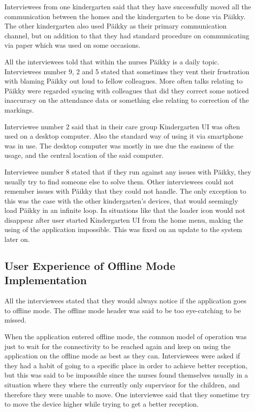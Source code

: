 Interviewees from one kindergarten said that they have successfully moved all the communication between the homes and the kindergarten to be done via Päikky. The other kindergarten also used Päikky as their primary communication channel, but on addition to that they had standard procedure on communicating via paper which was used on some occasions.

All the interviewees told that within the nurses Päikky is a daily topic. Interviewees number 9, 2 and 5 stated that sometimes they vent their frustration with blaming Päikky out loud to fellow colleagues. More often talks relating to Päikky were regarded syncing with colleagues that did they correct some noticed inaccuracy on the attendance data or something else relating to correction of the markings.

Interviewee number 2 said that in their care group Kindergarten UI was often used on a desktop computer. Also the standard way of using it via smartphone was in use. The desktop computer was mostly in use due the easiness of the usage, and the central location of the said computer. 

Interviewee number 8 stated that if they run against any issues with Päikky, they usually try to find someone else to solve them. Other interviewees could not remember issues with Päikky that they could not handle. The only exception to this was the case with the other kindergarten's devices, that would seemingly load Päikky in an infinite loop. In situations like that the loader icon would not disappear after user started Kindergarten UI from the home menu, making the using of the application impossible. This was fixed on an update to the system later on.


\subsection{User Experience of Offline Mode Implementation}

All the interviewees stated that they would always notice if the application goes to offline mode. The offline mode header was said to be too eye-catching to be missed.

When the application entered offline mode, the common model of operation was just to wait for the connectivity to be reached again and keep on using the application on the offline mode as best as they can. Interviewees were asked if they had a habit of going to a specific place in order to achieve better reception, but this was said to be impossible since the nurses found themselves usually in a situation where they where the currently only supervisor for the children, and therefore they were unable to move. One interviewee said that they sometime try to move the device higher while trying to get a better reception.

